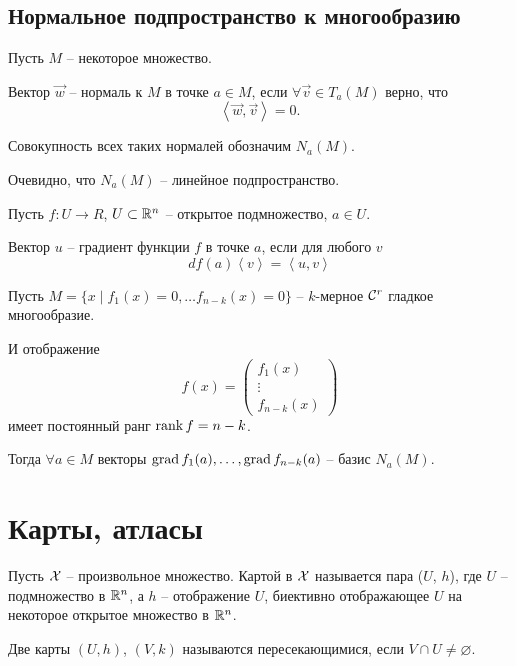 	\subsection{Нормальное подпространство к многообразию}
	\begin{mdef}
		Пусть $M$ -- некоторое множество.
		
		Вектор $\vec w$ -- нормаль к $M$ в точке $a\in M$, если 
		$\forall \vec v \in T_a(M)$ верно, что
		$$
			\left< \vec w, \vec v \right> =0.
		$$
		
		Совокупность всех таких нормалей обозначим $N_a(M)$. 
		
		Очевидно, что $N_a(M)$ -- линейное подпространство.
	\end{mdef}
	\begin{mdef}
		Пусть $f \colon U \to R$, $U \subset \mathbb{R}^n$ -- открытое подмножество, $a \in U$. 
		
		Вектор $u$ -- градиент функции $f$ в точке $a$, если для любого $v$
		$$
			df(a)\left<v\right> = \left<u, v\right> 
		$$
	\end{mdef}
	\begin{statement}
		Пусть $M = \{x \mid f_{1}(x) = 0, \ldots f_{n-k}(x) =0\}$ -- $k$-мерное $\mathcal{C}^r$ гладкое многообразие.
		
		И отображение 
		$$
			f(x) = \begin{pmatrix}
				f_1(x)\\
				\vdots\\
				f_{n-k}(x)
			\end{pmatrix}
		$$ имеет постоянный ранг $\text{rank\,}f=n-k$.
		
		Тогда $\forall a\in M$ векторы $\text{grad\,}f_{1}(a), \ldots, \text{grad\,}f_{n-k}(a)$ -- базис $N_a(M)$. 
	\end{statement}
	
	\section{Карты, атласы}
	
	\begin{mdef}
		Пусть $\mathcal{X}$ -- произвольное множество. Картой в $\mathcal{X}$ называется пара ($U$, $h$), где $U$ -- подмножество в $\mathbb{R}^n$, 
		а $h$ -- отображение $U$, биективно отображающее $U$ на некоторое открытое множество в $\mathbb{R}^n$.  
	\end{mdef}

	\begin{mdef}
		Две карты $(U, h)$, $(V, k)$ называются пересекающимися, если $V \cap U \not= \varnothing$. 
	\end{mdef}

